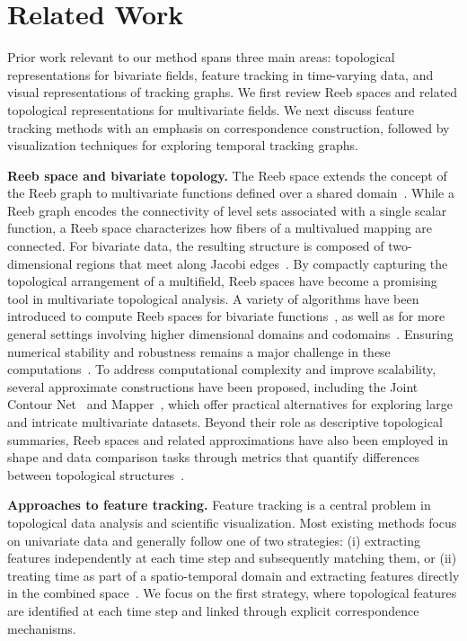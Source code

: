 \documentclass[review]{vgtc}                          %
\newcommand{\myparagraph}[1]{\vspace{1mm} \noindent \textbf{#1}}
\begin{document}
\section{Related Work}
Prior work relevant to our method spans three main areas: topological representations for bivariate fields, feature tracking in time-varying data, and visual representations of tracking graphs. We first review Reeb spaces and related topological representations for multivariate fields. We next discuss feature tracking methods with an emphasis on correspondence construction, followed by visualization techniques for exploring temporal tracking graphs.


\myparagraph{Reeb space and bivariate topology.} The Reeb space extends the concept of the Reeb graph to multivariate functions defined over a shared domain~\cite{Edelsbrunner2008}. While a Reeb graph encodes the connectivity of level sets associated with a single scalar function, a Reeb space characterizes how fibers of a multivalued mapping are connected. For bivariate data, the resulting structure is composed of two-dimensional regions that meet along Jacobi edges~\cite{Edelsbrunner2004b}. 
By compactly capturing the topological arrangement of a multifield, Reeb spaces have become a promising tool in multivariate topological analysis. A variety of algorithms have been introduced to compute Reeb spaces for bivariate functions~\cite{Tierny2017,chattopadhyayAlgorithmFastCorrect2024,Hristov2026SingularAA}, as well as for more general settings involving higher dimensional domains and codomains~\cite{Edelsbrunner2008,hristov2025}. 
Ensuring numerical stability and robustness remains a major challenge in these computations~\cite{Hristov2025b}. To address computational complexity and improve scalability, several approximate constructions have been proposed, including the Joint Contour Net~\cite{Carr2014} and Mapper~\cite{Dey2016,Brown2021}, which offer practical alternatives for exploring large and intricate multivariate datasets. Beyond their role as descriptive topological summaries, Reeb spaces and related approximations have also been employed in shape and data comparison tasks through metrics that quantify differences between topological structures~\cite{Ramamurthi2022a,Agarwal2021,Ramamurthi2024}.

\myparagraph{Approaches to feature tracking.} Feature tracking is a central problem in topological data analysis and scientific visualization. Most existing methods focus on univariate data and generally follow one of two strategies: (i) extracting features independently at each time step and subsequently matching them, or (ii) treating time as part of a spatio-temporal domain and extracting features directly in the combined space~\cite{Post2003}. We focus on the first strategy, where topological features are identified at each time step and linked through explicit correspondence mechanisms.
\end{document}
